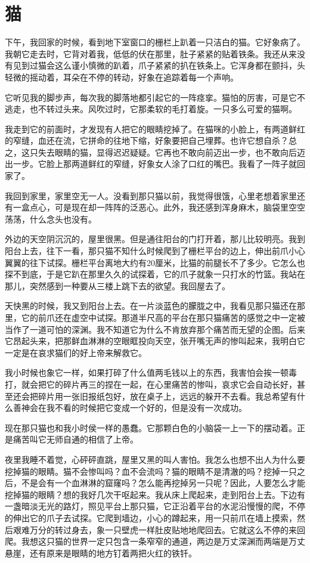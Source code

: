 \chapter{猫}

下午，我回家的时候，看到地下室窗口的栅栏上趴着一只洁白的猫。它好象病了。我朝它走去时，它背对着我，低低的伏在那里，肚子紧紧的贴着铁条。我还从来没有见到过猫会这么谨小慎微的趴着，爪子紧紧的扒在铁条上。它浑身都在颤抖，头轻微的摇动着，耳朵在不停的转动，好象在追踪着每一个声响。 

它听见我的脚步声，每次我的脚落地都引起它的一阵痉挛。猫怕的厉害，可是它不逃走，也不转过头来。风吹过时，它那柔软的毛打着旋。一只多么可爱的猫啊。 

我走到它的前面时，才发现有人把它的眼睛挖掉了。在猫咪的小脸上，有两道鲜红的窄缝，血还在流，它拼命的往地下缩，好象要把自己埋葬。也许它想自杀？总之，这只失去眼睛的猫，显得迟迟疑疑。它再也不敢向前迈出一步，也不敢向后迈出一步。它脸上那两道鲜红的窄缝，好象女人涂了口红的嘴巴。我看了一阵子就回家了。 

我回到家里，家里空无一人。没看到那只猫以前，我觉得很饿，心里老想着家里还有一盒点心，可是现在却一阵阵的泛恶心。此外，我还感到浑身麻木，脑袋里空空荡荡，什么念头也没有。 

外边的天空阴沉沉的，屋里很黑。但是通往阳台的门打开着，那儿比较明亮。我到阳台上去，往下一看，那只猫不知什么时候爬到了栅栏平台的边上，伸出前爪小心翼翼的往下试探。栅栏平台离地大约有20厘米，比猫的前腿长不了多少。它怎么也探不到底，于是它趴在那里久久的试探着，它的爪子就象一只打水的竹篮。我站在那儿，突然感到一种要从三楼上跳下去的欲望。我回屋去了。 

天快黑的时候，我又到阳台上去。在一片淡蓝色的朦胧之中，我看见那只猫还在那里，它的前爪还在虚空中试探。那道半尺高的平台在那只猫痛苦的感觉之中一定被当作了一道可怕的深渊。我不知道它为什么不肯放弃那个痛苦而无望的企图。后来它昂起头来，把那鲜血淋淋的空眼眶投向天空，张开嘴无声的惨叫起来，我明白它一定是在哀求猫们的好上帝来解救它。 

我小时候也象它一样，如果打碎了什么值两毛钱以上的东西，我害怕会挨一顿毒打，就会把它的碎片再三的捏在一起，在心里痛苦的惨叫，哀求它会自动长好，甚至还会把碎片用一张旧报纸包好，放在桌子上，远远的躲开不去看。我总希望有什么善神会在我不看的时候把它变成一个好的，但是没有一次成功。 

现在那只猫也和我小时侯一样的愚蠢。它那颗白色的小脑袋一上一下的摆动着。正是痛苦叫它无师自通的相信了上帝。 

夜里我睡不着觉，心砰砰直跳，屋里又黑的叫人害怕。我怎么也想不出人为什么要挖掉猫的眼睛。猫不会惨叫吗？血不会流吗？猫的眼睛不是清澈的吗？挖掉一只之后，不是会有一个血淋淋的窟窿吗？怎么能再挖掉另一只呢？因此，人要怎么才能挖掉猫的眼睛？想的我好几次干呕起来。我从床上爬起来，走到阳台上去。下边有一盏暗淡无光的路灯，照见平台上那只猫，它正沿着平台的水泥沿慢慢的爬，不停的伸出它的爪子去试探。它爬到墙边，小心的蹲起来，用一只前爪在墙上摸索，然后艰难万分的转过身去，象一只壁虎一样肚皮贴地地爬回去。它就这么不停的来回爬。我想这只猫的世界一定只包含一条窄窄的通道，两边是万丈深渊而两端是万丈悬崖，还有原来是眼睛的地方钉着两把火红的铁钎。 

